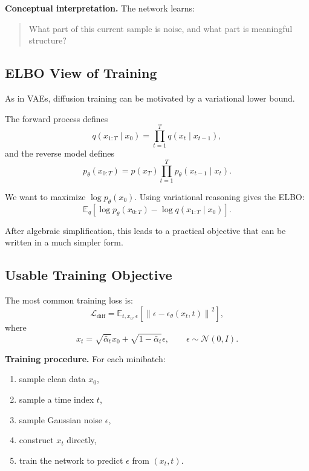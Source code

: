 \medskip

\noindent
\textbf{Conceptual interpretation.}
The network learns:
\begin{quote}
What part of this current sample is noise, and what part is meaningful structure?
\end{quote}

\subsection{ELBO View of Training}

As in VAEs, diffusion training can be motivated by a variational lower bound.

\medskip

\noindent
The forward process defines
\[
q(x_{1:T}\mid x_0)=\prod_{t=1}^T q(x_t\mid x_{t-1}),
\]
and the reverse model defines
\[
p_\theta(x_{0:T})=p(x_T)\prod_{t=1}^T p_\theta(x_{t-1}\mid x_t).
\]

\medskip

\noindent
We want to maximize $\log p_\theta(x_0)$. Using variational reasoning gives the ELBO:
\[
\mathbb{E}_q
\left[
\log p_\theta(x_{0:T}) - \log q(x_{1:T}\mid x_0)
\right].
\]

\medskip

\noindent
After algebraic simplification, this leads to a practical objective that can be written in a much simpler form.

\subsection{Usable Training Objective}

The most common training loss is:
\[
\mathcal{L}_{\text{diff}}
=
\mathbb{E}_{t,x_0,\epsilon}
\left[
\left\|
\epsilon - \epsilon_\theta(x_t,t)
\right\|^2
\right],
\]
where
\[
x_t = \sqrt{\bar{\alpha}_t}x_0 + \sqrt{1-\bar{\alpha}_t}\epsilon,
\qquad
\epsilon \sim \mathcal{N}(0,I).
\]

\medskip

\noindent
\textbf{Training procedure.}
For each minibatch:
\begin{enumerate}
    \item sample clean data $x_0$,
    \item sample a time index $t$,
    \item sample Gaussian noise $\epsilon$,
    \item construct $x_t$ directly,
    \item train the network to predict $\epsilon$ from $(x_t,t)$.
\end{enumerate}


